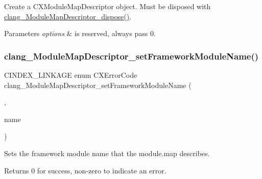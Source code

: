 Create a {\ttfamily C\+X\+Module\+Map\+Descriptor} object. Must be disposed with {\ttfamily \hyperlink{group__BUILD__SYSTEM_gad905d6dc860716f1a35d2b87f46b81f9}{clang\+\_\+\+Module\+Map\+Descriptor\+\_\+dispose()}}. 


\begin{DoxyParams}{Parameters}
{\em options} & is reserved, always pass 0. \\
\hline
\end{DoxyParams}
\mbox{\label{group__BUILD__SYSTEM_gaaad31887de3a3856891a846e96f59802}} 
\subsubsection{\texorpdfstring{clang\+\_\+\+Module\+Map\+Descriptor\+\_\+set\+Framework\+Module\+Name()}{clang\_ModuleMapDescriptor\_setFrameworkModuleName()}}
{\footnotesize\ttfamily C\+I\+N\+D\+E\+X\+\_\+\+L\+I\+N\+K\+A\+GE enum C\+X\+Error\+Code clang\+\_\+\+Module\+Map\+Descriptor\+\_\+set\+Framework\+Module\+Name (\begin{DoxyParamCaption}\item[{\hyperlink{group__BUILD__SYSTEM_ga8d7eea7855a8d1118218c7661469b3db}{C\+X\+Module\+Map\+Descriptor}}]{,  }\item[{const char $\ast$}]{name }\end{DoxyParamCaption})}



Sets the framework module name that the module.\+map describes. 

\begin{DoxyReturn}{Returns}
0 for success, non-\/zero to indicate an error. 
\end{DoxyReturn}
\mbox{\label{group__BUILD__SYSTEM_ga63b8b9689c04f6b0c292d1226652a74b}} 
